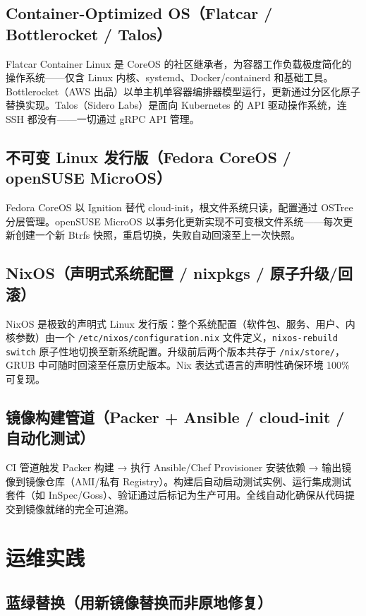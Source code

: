 \documentclass[12pt,UTF8]{ctexbook}
\begin{document}
    \subsection{Container-Optimized OS（Flatcar / Bottlerocket / Talos）}

Flatcar Container Linux 是 CoreOS 的社区继承者，为容器工作负载极度简化的操作系统——仅含 Linux 内核、systemd、Docker/containerd 和基础工具。Bottlerocket（AWS 出品）以单主机单容器编排器模型运行，更新通过分区化原子替换实现。Talos（Sidero Labs）是面向 Kubernetes 的 API 驱动操作系统，连 SSH 都没有——一切通过 gRPC API 管理。

    \subsection{不可变 Linux 发行版（Fedora CoreOS / openSUSE MicroOS）}

Fedora CoreOS 以 Ignition 替代 cloud-init，根文件系统只读，配置通过 OSTree 分层管理。openSUSE MicroOS 以事务化更新实现不可变根文件系统——每次更新创建一个新 Btrfs 快照，重启切换，失败自动回滚至上一次快照。

    \subsection{NixOS（声明式系统配置 / nixpkgs / 原子升级/回滚）}

NixOS 是极致的声明式 Linux 发行版：整个系统配置（软件包、服务、用户、内核参数）由一个 \verb|/etc/nixos/configuration.nix| 文件定义，\verb|nixos-rebuild switch| 原子性地切换至新系统配置。升级前后两个版本共存于 \verb|/nix/store/|，GRUB 中可随时回滚至任意历史版本。Nix 表达式语言的声明性确保环境 100\% 可复现。

    \subsection{镜像构建管道（Packer + Ansible / cloud-init / 自动化测试）}

CI 管道触发 Packer 构建 → 执行 Ansible/Chef Provisioner 安装依赖 → 输出镜像到镜像仓库（AMI/私有 Registry）。构建后自动启动测试实例、运行集成测试套件（如 InSpec/Goss）、验证通过后标记为生产可用。全线自动化确保从代码提交到镜像就绪的完全可追溯。

  \section{运维实践}
    \subsection{蓝绿替换（用新镜像替换而非原地修复）}
\end{document}
